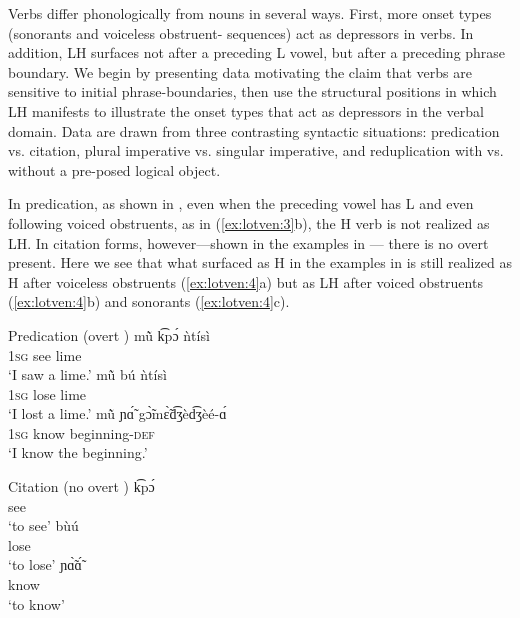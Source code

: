 \documentclass[output=paper,newtxmath,modfonts,nonflat,hidelinks]{langsci/langscibook}
\begin{document}
Verbs differ phonologically from nouns in several ways. First, more onset types (sonorants and voiceless obstruent- sequences) act as depressors in verbs. In addition, LH  surfaces not after a preceding L  vowel, but after a preceding phrase boundary. We begin by presenting data motivating the claim that verbs are sensitive to initial phrase-boundaries, then use the structural positions in which LH  manifests to illustrate the onset types that act as depressors in the verbal domain. Data are drawn from three contrasting syntactic situations: predication vs. citation, plural imperative vs. singular imperative, and reduplication with vs. without a pre-posed logical object.

In predication, as shown in , even when the preceding vowel has L  and even following voiced obstruents, as in (\ref{ex:lotven:3}b), the H  verb is not realized as LH. In citation forms, however—shown in the examples in  — there is no overt  present. Here we see that what surfaced as H in the examples in  is still realized as H after voiceless obstruents (\ref{ex:lotven:4}a) but as LH after voiced obstruents (\ref{ex:lotven:4}b) and sonorants (\ref{ex:lotven:4}c).

\ea\label{ex:lotven:3} Predication (overt )
\ea\label{ex:lotven:3a} \gll mũ̀ k͡pɔ́ ǹtísì\\
1\textsc{sg} see lime \\
\glt ‘I saw a lime.’ 
\ex\label{ex:lotven:3b}	\gll mũ̀ bú ǹtísì\\
1\textsc{sg} lose lime\\
\glt ‘I lost a lime.’
\ex\label{ex:lotven:3c} \gll mũ̀ ɲɑ̃́ gɔ̃̀mɛ̃̀d͡ʒèd͡ʒèé-ɑ́\\
1\textsc{sg} know beginning-\textsc{def} \\
\glt ‘I know the beginning.’
\z
\z


\ea\label{ex:lotven:4} Citation (no overt )
\ea\label{ex:lotven:4a}
    \gll k͡pɔ́\\
    see    \\
    \glt ‘to see’
\ex\label{ex:lotven:4b}
	\gll bùú\\
    lose\\
    \glt ‘to lose’
\ex\label{ex:lotven:4c}
	\gll ɲɑ̃̀ɑ̃́\\
    know\\
    \glt ‘to know’
\z
\z
                           
\end{document}
